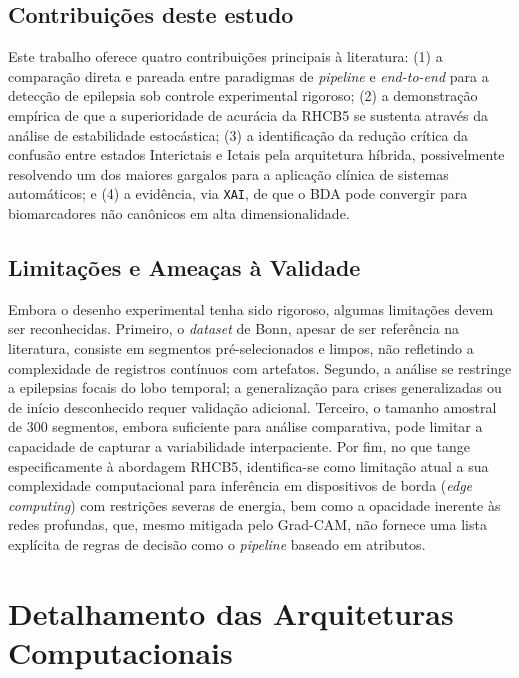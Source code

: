 \documentclass[alpha-refs,brazilian]{CC-EC_TF-TC}
\begin{document}
\subsection{Contribuições deste estudo}

Este trabalho oferece quatro contribuições principais à literatura: (1) a comparação direta e pareada entre paradigmas de \textit{pipeline} e \textit{end-to-end} para a detecção de epilepsia sob controle experimental rigoroso; (2) a demonstração empírica de que a superioridade de acurácia da RHCB5 se sustenta através da análise de estabilidade estocástica; (3) a identificação da redução crítica da confusão entre estados Interictais e Ictais pela arquitetura híbrida, possivelmente resolvendo um dos maiores gargalos para a aplicação clínica de sistemas automáticos; e (4) a evidência, via \texttt{XAI}, de que o BDA pode convergir para biomarcadores não canônicos em alta dimensionalidade.

\subsection{Limitações e Ameaças à Validade}

Embora o desenho experimental tenha sido rigoroso, algumas limitações devem ser reconhecidas. Primeiro, o \textit{dataset} de Bonn, apesar de ser referência na literatura, consiste em segmentos pré-selecionados e limpos, não refletindo a complexidade de registros contínuos com artefatos. Segundo, a análise se restringe a epilepsias focais do lobo temporal; a generalização para crises generalizadas ou de início desconhecido requer validação adicional. Terceiro, o tamanho amostral de 300 segmentos, embora suficiente para análise comparativa, pode limitar a capacidade de capturar a variabilidade interpaciente. Por fim, no que tange especificamente à abordagem RHCB5, identifica-se como limitação atual a sua complexidade computacional para inferência em dispositivos de borda (\textit{edge computing}) com restrições severas de energia, bem como a opacidade inerente às redes profundas, que, mesmo mitigada pelo Grad-CAM, não fornece uma lista explícita de regras de decisão como o \textit{pipeline} baseado em atributos.

\clearpage

\appendix
\renewcommand{\thesection}{\Alph{section}}
\section{Detalhamento das Arquiteturas Computacionais}
\label{apendice:arquiteturas}
\end{document}
